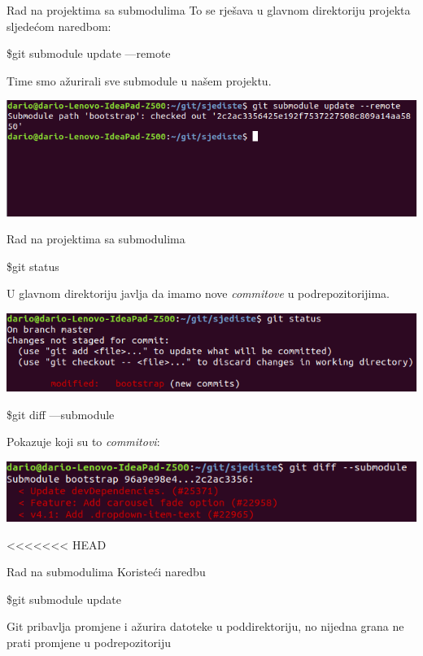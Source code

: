 \documentclass[10pt]{beamer}
\begin{document}
\begin{frame}[fragile]{Rad na projektima sa submodulima}
	To se rješava u glavnom direktoriju projekta sljedećom naredbom:
	\begin{semiverbatim}\$git submodule update ---remote\end{semiverbatim}
	Time smo ažurirali sve submodule u našem projektu.

	\includegraphics[scale=0.4]{sub_update}
\end{frame}

\begin{frame}[fragile]{Rad na projektima sa submodulima}
	\begin{semiverbatim}\$git status\end{semiverbatim}
	U glavnom direktoriju javlja da imamo nove \emph{commitove} u podrepozitorijima.

	\includegraphics[scale=0.4]{sub_status2}

	\begin{semiverbatim}\$git diff ---submodule\end{semiverbatim}
	Pokazuje koji su to \emph{commitovi}:

	\includegraphics[scale=0.4]{sub_diff2}
\end{frame}

<<<<<<< HEAD
\begin{frame}[fragile]{Rad na submodulima}
    Koristeći naredbu 
    
    \begin{semiverbatim}\$git submodule update \end{semiverbatim}
    
    Git pribavlja promjene i ažurira datoteke u poddirektoriju, no nijedna grana ne prati promjene u podrepozitoriju
    
\end{frame}
\end{document}
